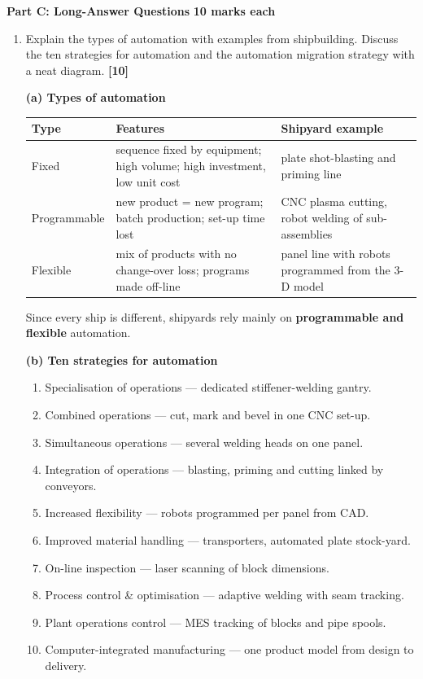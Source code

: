 \documentclass[11pt,a4paper]{article}
\newcommand{\qmarks}[1]{\hfill\textbf{[#1]}}
\newcommand{\partheading}[2]{%
	\bigskip
	\begin{tcolorbox}[colback=cAccent!10, colframe=cAccent, boxrule=0.6pt, arc=2pt, left=6pt, top=3pt, bottom=3pt]
		\textbf{\large #1} \hfill \textbf{#2}
	\end{tcolorbox}}
\begin{document}
	\partheading{Part C: Long-Answer Questions}{10 marks each}
	\begin{enumerate}

		\item Explain the types of automation with examples from shipbuilding. Discuss the ten strategies for automation and the automation migration strategy with a neat diagram. \qmarks{10}
		\begin{answer}
			\textbf{(a) Types of automation}
			\begin{center}
				\small
				\begin{tabular}{@{}p{2.5cm}p{5.2cm}p{6.0cm}@{}}
					\toprule
					\textbf{Type} & \textbf{Features} & \textbf{Shipyard example} \\
					\midrule
					Fixed        & sequence fixed by equipment; high volume; high investment, low unit cost & plate shot-blasting and priming line \\
					Programmable & new product = new program; batch production; set-up time lost & CNC plasma cutting, robot welding of sub-assemblies \\
					Flexible     & mix of products with no change-over loss; programs made off-line & panel line with robots programmed from the 3-D model \\
					\bottomrule
				\end{tabular}
			\end{center}
			Since every ship is different, shipyards rely mainly on \textbf{programmable and flexible} automation.

			\textbf{(b) Ten strategies for automation}
			\begin{enumerate}[label=\arabic*., itemsep=0pt, leftmargin=1.5em]
				\item Specialisation of operations --- dedicated stiffener-welding gantry.
				\item Combined operations --- cut, mark and bevel in one CNC set-up.
				\item Simultaneous operations --- several welding heads on one panel.
				\item Integration of operations --- blasting, priming and cutting linked by conveyors.
				\item Increased flexibility --- robots programmed per panel from CAD.
				\item Improved material handling --- transporters, automated plate stock-yard.
				\item On-line inspection --- laser scanning of block dimensions.
				\item Process control \& optimisation --- adaptive welding with seam tracking.
				\item Plant operations control --- MES tracking of blocks and pipe spools.
				\item Computer-integrated manufacturing --- one product model from design to delivery.
			\end{enumerate}


\end{answer}
\end{enumerate}
\end{document}
